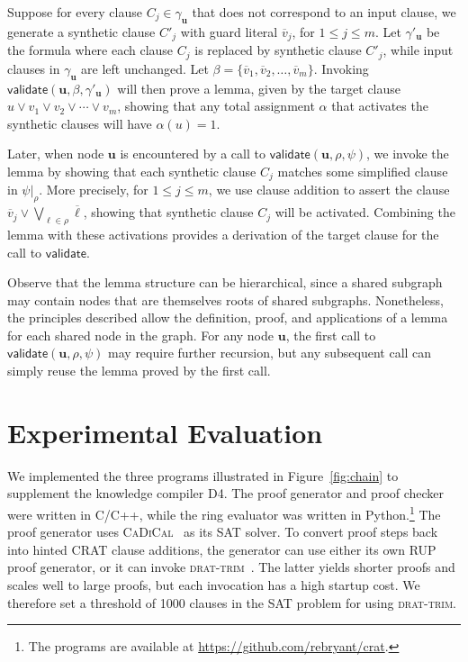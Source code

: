 \documentclass[letterpaper,USenglish,cleveref, autoref, thm-restate]{lipics-v2021}
\newcommand{\obar}[1]{\overline{#1}}
\newcommand{\lit}{\ell}
\newcommand{\assign}{\alpha}
\newcommand{\passign}{\rho}
\newcommand{\lassign}{\beta}
\newcommand{\validate}{\textsf{validate}}
\newcommand{\makenode}[1]{\mathbf{#1}}
\newcommand{\nodeu}{\makenode{u}}
\newcommand{\simplify}[2]{#1|_{#2}}
\newcommand{\progname}[1]{\textsc{#1}}
\newcommand{\dfour}{\progname{D4}}
\newcommand{\cadical}{\progname{CaDiCal}}
\newcommand{\dtrim}{\progname{drat-trim}}
\begin{document}
Suppose for every clause $C_j \in \gamma_{\nodeu}$ that does not correspond to
an input clause, we generate a synthetic clause $C'_j$ with guard literal
$\obar{v}_j$, for $1 \leq j \leq m$.  Let $\gamma'_{\nodeu}$ be the formula where each clause $C_j$ is replaced by synthetic clause $C'_j$,
while input clauses in $\gamma_{\nodeu}$ are left unchanged.
Let $\lassign = \{ \obar{v}_1, \obar{v}_2, \ldots, \obar{v}_m \}$.
Invoking $\validate(\nodeu, \lassign, \gamma'_{\nodeu})$
 will then prove a lemma, given by the target clause
 $u \lor v_1 \lor v_2 \lor \cdots \lor v_m$,
 showing that any total assignment $\assign$ that activates the synthetic clauses will have $\assign(u) = 1$.

Later, when node $\nodeu$ is encountered by a call to $\validate(\nodeu, \passign, \psi)$, we invoke the lemma
by showing that each synthetic clause
$C_j$ matches some simplified clause in $\simplify{\psi}{\passign}$.  More precisely,
for $1 \leq j \leq m$,
we use clause addition to assert the clause
$\obar{v}_j \lor \bigvee_{\lit \in \passign} \obar{\lit}$,
showing that synthetic clause $C_j$ will be activated.
Combining the lemma with these activations provides a derivation of the target clause for the call to $\validate$.

Observe that the lemma structure can be hierarchical, since a shared
subgraph may contain nodes that are themselves roots of shared
subgraphs.  Nonetheless, the principles described allow the
definition, proof, and applications of a lemma for each shared node in
the graph.  For any node $\nodeu$, the first call to
$\validate(\nodeu, \passign, \psi)$ may require further recursion,
but any subsequent call can simply reuse the lemma proved by the first call.





\section{Experimental Evaluation}
\label{sect:experimental}

We implemented the three programs illustrated in
Figure~\ref{fig:chain} to supplement the knowledge compiler \dfour{}.
The proof generator and proof checker were written in C/C++, while the
ring evaluator was written in Python.\footnote{The programs are
available at \url{https://github.com/rebryant/crat}.}  The proof
generator uses \cadical{}~\cite{biere-cadical-2019} as its SAT solver.  To convert proof steps
back into hinted CRAT clause additions, the generator can use either
its own RUP proof generator, or it can invoke \dtrim{}~\cite{RAT}.
The latter yields shorter proofs and scales well to large proofs, but
each invocation has a high startup cost.  We therefore set a threshold
of 1000 clauses in the SAT problem for using \dtrim{}.
\end{document}
